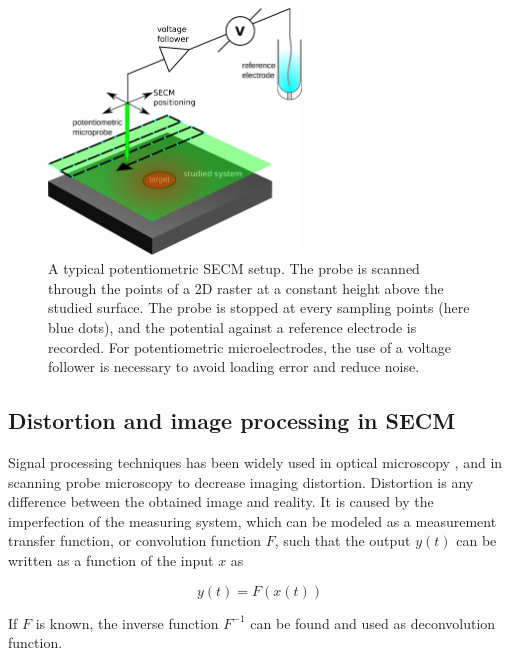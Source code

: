 \begin{figure}[h]
\centering
\includegraphics[width=0.6\textwidth]{img/theory/secm.eps}
\caption[A typical potentiometric SECM setup.]{A typical potentiometric SECM setup.
The probe is scanned through the points of a 2D raster at a constant height above the studied surface.
The probe is stopped at every sampling points (here blue dots), and the potential against a reference electrode is recorded.
For potentiometric microelectrodes, the use of a voltage follower is necessary to avoid loading error and reduce noise.}
\label{fig:secm}
\end{figure}




\subsection{Distortion and image processing in SECM}
Signal processing techniques has been widely used in optical microscopy \cite{schrader1996potential}, and in scanning probe microscopy to decrease imaging distortion.
Distortion is any difference between the obtained image and reality.
It is caused by the imperfection of the measuring system, which can be modeled as a measurement transfer function, or convolution function $F$, such that the output $y(t)$ can be written as a function of the input $x$ as

\begin{equation}
\label{convolution}
        y(t) = F(x(t))
\end{equation}

If $F$ is known, the inverse function $F^{-1}$ can be found and used as deconvolution function.

